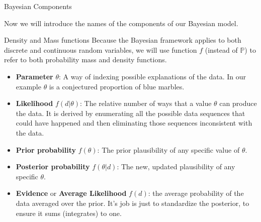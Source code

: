 \documentclass[handout]{beamer}
\begin{document}
\begin{frame}{Bayesian Components}
\scriptsize{
Now we will introduce the names of the components of our Bayesian model. \\


\begin{block}{Density and Mass functions}
Because the Bayesian framework applies to both discrete and continuous random variables, we will use function $f$ (instead of $\mathbb{P}$) to refer to both probability mass and density functions.
\end{block}

\begin{itemize}
\item \textbf{Parameter} $\theta$:  A way of indexing possible explanations of the data. In our example $\theta$ is a conjectured proportion of blue marbles. 

\item \textbf{Likelihood} $f(d|\theta)$: The relative number of ways that a value $\theta$ can produce the data. It is derived by enumerating all the possible data sequences that could have happened and then eliminating those sequences inconsistent with the data.
\item \textbf{Prior probability} $f(\theta)$: The prior plausibility of any specific value of $\theta$.
 
\item \textbf{Posterior probability} $f(\theta|d)$: The new, updated plausibility of any specific $\theta$. 

\item \textbf{Evidence} or \textbf{Average Likelihood} $f(d)$: the average probability of the data averaged over the prior. It’s job is just to standardize the posterior, to ensure it sums (integrates) to one. 
 
\end{itemize}
 } 

 
 
 
\end{frame}
\end{document}
